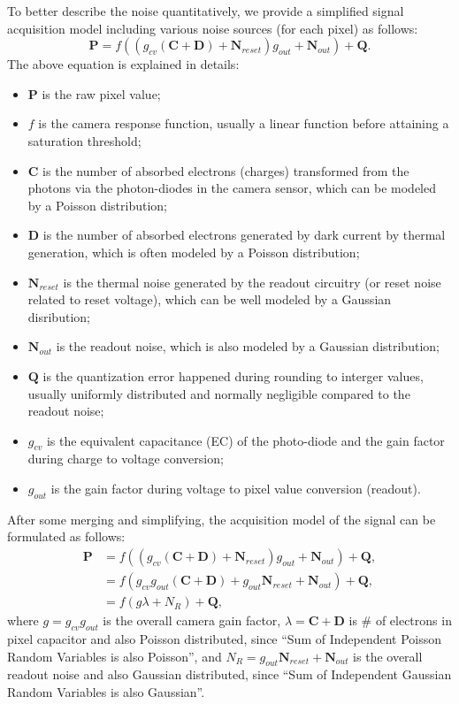To better describe the noise quantitatively, we provide a simplified signal acquisition model \cite{} including various noise sources (for each pixel) as follows:
\begin{equation}
\label{e11}
\bm{P} = f((g_{cv}(\bm{C}+\bm{D})+\bm{N}_{reset})g_{out}+\bm{N}_{out})+\bm{Q}.
\end{equation}
The above equation is explained in details: 
\begin{itemize}
\item $\bm{P}$ is the raw pixel value;
\item $f$ is the camera response function, usually a linear function before attaining a saturation threshold;
\item $\bm{C}$ is the number of absorbed electrons (charges) transformed from the photons via the photon-diodes in the camera sensor, which can be modeled by a Poisson distribution;
\item $\bm{D}$ is the number of absorbed electrons generated by dark current by thermal generation, which is often modeled by a Poisson distribution;
\item $\bm{N}_{reset}$ is the thermal noise generated by the readout circuitry (or reset noise related to reset voltage), which can be well modeled by a Gaussian disribution;
\item $\bm{N}_{out}$ is the readout noise, which is also modeled by a Gaussian distribution;
\item $\bm{Q}$ is the quantization error happened during rounding to interger values, usually uniformly distributed and normally negligible compared to the readout noise;
\item $g_{cv}$ is the equivalent capacitance (EC) of the photo-diode and the gain factor during charge to voltage conversion;
\item $g_{out}$ is the gain factor during voltage to pixel value conversion (readout).
\end{itemize}
After some merging and simplifying, the acquisition model of the signal can be formulated as follows:
\begin{equation}
\label{e12}
\begin{split}
\textbf{P} 
&=f((g_{cv}(\textbf{C}+\textbf{D})+\textbf{N}_{reset})g_{out}+\textbf{N}_{out})+\textbf{Q},
\\
&=f(g_{cv}g_{out}(\textbf{C}+\textbf{D})+g_{out}\textbf{N}_{reset}+\textbf{N}_{out})+\textbf{Q},
\\
&=f(g\lambda+N_{R})+\textbf{Q},
\end{split}
\end{equation}
where $g = g_{cv}g_{out}$ is the overall camera gain factor, $\lambda=\textbf{C}+\textbf{D}$ is \# of electrons in pixel capacitor and also Poisson distributed, since ``Sum of Independent Poisson Random Variables is also Poisson'', and $N_{R}=g_{out}\textbf{N}_{reset}+\textbf{N}_{out}$ is the overall readout noise and also Gaussian distributed, since ``Sum of Independent Gaussian Random Variables is also Gaussian''.


